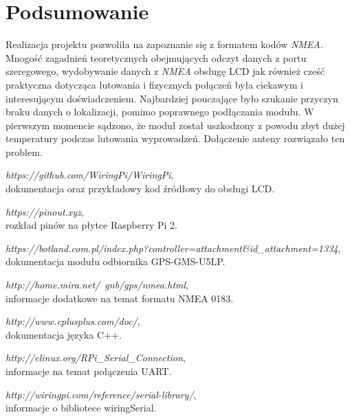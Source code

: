 \documentclass{article}
\begin{document}
\section{Podsumowanie}
	Realizacja projektu pozwoliła na zapoznanie się z formatem kodów \textit{NMEA}. Mnogość zagadnień teoretycznych obejmujących odczyt danych z portu szeregowego, wydobywanie danych z \textit{NMEA} obsługę LCD jak również cześć praktyczna dotycząca lutowania i fizycznych połączeń była ciekawym i interesującym doświadczeniem. Najbardziej pouczające było szukanie przyczyn braku danych o lokalizacji, pomimo poprawnego podłączania modułu. W pierwszym momencie sądzono, że moduł został uszkodzony z powodu zbyt dużej temperatury podczas lutowania wyprowadzeń. Dołączenie anteny rozwiązało ten problem.
\newpage
	\begin{thebibliography}{999}
		{\em https://github.com/WiringPi/WiringPi}, \\
		dokumentacja oraz przykładowy kod źródłowy do obsługi LCD.
		
		{\em https://pinout.xyz}, \\
		rozkład pinów na płytce Raspberry Pi 2.
		
				{\em https://botland.com.pl/index.php?controller=attachment\&id\_attachment=1334}, \\
				dokumentacja modułu odbiornika GPS-GMS-U5LP.
				
		{\em http://home.mira.net/~gnb/gps/nmea.html}, \\
		informacje dodatkowe na temat formatu NMEA 0183.
		
				{\em http://www.cplusplus.com/doc/}, \\
				dokumentacja języka C++.
		
						{\em http://elinux.org/RPi\_Serial\_Connection}, \\
						informacje na temat połączenia UART.
		
		{\em 	http://wiringpi.com/reference/serial-library/}, \\
		informacje o bibliotece wiringSerial.

		
		
		
	\end{thebibliography}	
\end{document}
